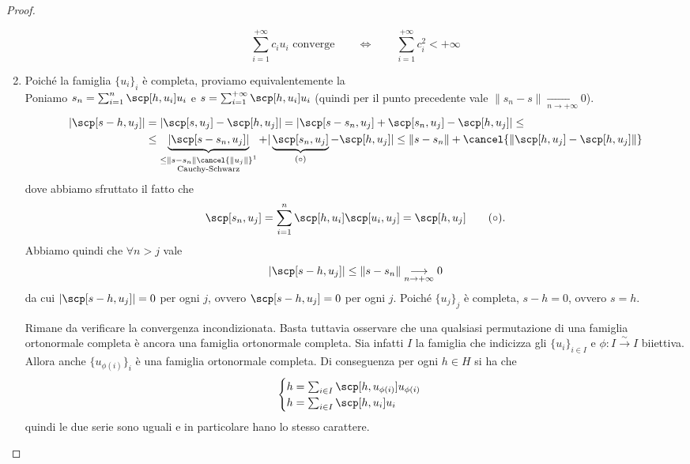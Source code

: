 \begin{proof}
\begin{enumerate}
        \[\sum_{i=1}^{+\infty}c_iu_i \text{ converge}\qquad \iff \qquad \sum_{i=1}^{+\infty}c_i^2<+\infty\]
        \item Poiché la famiglia $\{u_i\}_{i}$ è completa, proviamo equivalentemente la \\
        Poniamo $s_n = \sum_{i=1}^n \scp[h,u_i]u_i$ e $s = \sum_{i=1}^{+\infty} \scp[h,u_i]u_i$ (quindi per il punto precedente vale $\|s_n-s\|\underset{n\to +\infty}\longrightarrow 0$). 
        \begin{align*}
            |\scp[s-h,u_j]|&=|\scp[s,u_j]-\scp[h,u_j]| = |\scp[s-s_n,u_j]+\scp[s_n,u_j] - \scp[h,u_j]| \leq \\&\leq \underbrace{|\scp[s-s_n,u_j]|}_{\substack{\leq \|s-s_n\|\cancel{\|u_j\|}^1\\\text{Cauchy-Schwarz}}} +|\underbrace{\scp[s_n,u_j]}_{(\circ)}-\scp[h,u_j]|\leq \|s-s_n\|+\cancel{\|\scp[h,u_j]-\scp[h,u_j]\|}
        \end{align*}
        dove abbiamo sfruttato il fatto che
        \[\scp[s_n,u_j]=\sum_{i=1}^n\scp[h,u_i]\scp[u_i,u_j]=\scp[h,u_j]\tag{$\circ$}.\]
        Abbiamo quindi che $\forall n>j$ vale
        \[|\scp[s-h,u_j]|\leq \|s-s_n\|\underset{n\to +\infty}{\longrightarrow}0\]
        da cui $|\scp[s-h,u_j]|=0$ per ogni $j$, ovvero $\scp[s-h,u_j]=0$ per ogni $j$. Poiché $\{u_j\}_{j}$ è completa, $s-h=0$, ovvero $s=h$.

        Rimane da verificare la convergenza incondizionata. Basta tuttavia osservare che una qualsiasi permutazione di una famiglia ortonormale completa è ancora una famiglia ortonormale completa. Sia infatti $I$ la famiglia che indicizza gli $\{u_i\}_{i\in I}$ e $\phi : I\overset{\sim}{\to} I$ biiettiva. Allora anche $\{u_{\phi(i)}\}_{i}$ è una famiglia ortonormale completa. Di conseguenza per ogni $h\in H$ si ha che
        \[\begin{cases}
            h = \sum_{i\in I}\scp[h,u_{\phi(i)}]u_{\phi(i)}\\
            h = \sum_{i\in I}\scp[h,u_i]u_i
        \end{cases}\]
        quindi le due serie sono uguali e in particolare hano lo stesso carattere.\qedhere
    \end{enumerate}
\end{proof}

